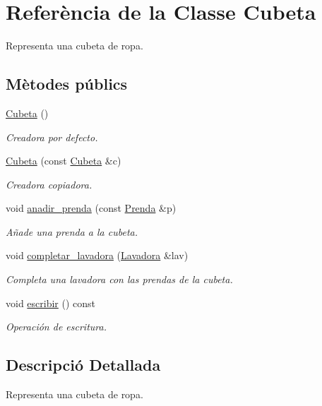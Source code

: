 \hypertarget{class_cubeta}{\section{Referència de la Classe Cubeta}
\label{class_cubeta}
}


Representa una cubeta de ropa.  


\subsection*{Mètodes públics}
\begin{DoxyCompactItemize}
\item 
\hyperlink{class_cubeta_ae85e70c9cd67454446439891e3f435e1}{Cubeta} ()
\begin{DoxyCompactList}\small\item\em Creadora por defecto. \end{DoxyCompactList}\item 
\hyperlink{class_cubeta_a9615e48038899c5732f61661585f12c7}{Cubeta} (const \hyperlink{class_cubeta}{Cubeta} \&c)
\begin{DoxyCompactList}\small\item\em Creadora copiadora. \end{DoxyCompactList}\item 
void \hyperlink{class_cubeta_a431873df8f99cebe56b4787a5271e395}{anadir\+\_\+prenda} (const \hyperlink{class_prenda}{Prenda} \&p)
\begin{DoxyCompactList}\small\item\em Añade una prenda a la cubeta. \end{DoxyCompactList}\item 
void \hyperlink{class_cubeta_a60a5a4f4133ce02f1e4fe49bbe8b9ec7}{completar\+\_\+lavadora} (\hyperlink{class_lavadora}{Lavadora} \&lav)
\begin{DoxyCompactList}\small\item\em Completa una lavadora con las prendas de la cubeta. \end{DoxyCompactList}\item 
void \hyperlink{class_cubeta_a878904c34f1b3361c3913bbaf735ed12}{escribir} () const 
\begin{DoxyCompactList}\small\item\em Operación de escritura. \end{DoxyCompactList}\end{DoxyCompactItemize}


\subsection{Descripció Detallada}
Representa una cubeta de ropa. 

